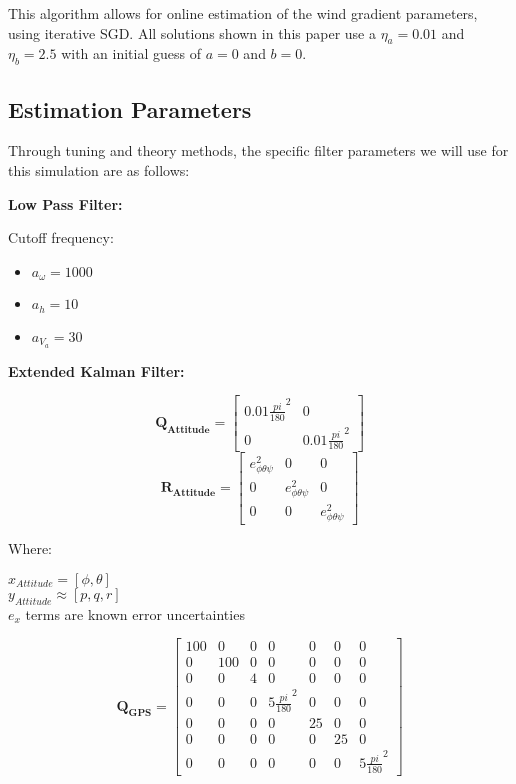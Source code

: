 This algorithm allows for online estimation of the wind gradient parameters, using iterative SGD.
All solutions shown in this paper use a $\eta_{a} = 0.01$ and $\eta_{b} = 2.5$ with an initial guess of $a = 0$ and $b = 0$.

\subsection{Estimation Parameters}

Through tuning and theory methods, the specific filter parameters we will use for this simulation are as follows:

\textbf{Low Pass Filter:}

Cutoff frequency:
\begin{itemize}
    \item $a_{\omega} = 1000$
    \item $a_{h} = 10$
    \item $a_{V_{a}} = 30$
\end{itemize}

\textbf{Extended Kalman Filter:}

\begin{equation}
    \mathbf{Q_{Attitude}} = \begin{bmatrix}
        0.01 \frac{pi}{180} ^ 2 & 0 \\
        0 & 0.01 \frac{pi}{180} ^ 2
    \end{bmatrix}
\end{equation}
\begin{equation}
    \mathbf{R_{Attitude}} = \begin{bmatrix}
        e_{\phi \theta \psi}^2 & 0 & 0 \\
        0 & e_{\phi \theta \psi}^2 & 0 \\
        0 & 0 & e_{\phi \theta \psi}^2
    \end{bmatrix}
\end{equation}

Where:
\begin{center}
$x_{Attitude} = [\phi, \theta]$ \\
$y_{Attitude} \approx [p, q, r]$ \\
$e_{x}$ terms are known error uncertainties
\end{center}


\begin{equation}
    \mathbf{Q_{GPS}} = \begin{bmatrix}
        100 & 0 & 0 & 0 & 0 & 0 & 0 \\
        0 & 100 & 0 & 0 & 0 & 0 & 0 \\
        0 & 0 & 4 & 0 & 0 & 0 & 0 \\
        0 & 0 & 0 & 5 \frac{pi}{180} ^ 2 & 0 & 0 & 0 \\
        0 & 0 & 0 & 0 & 25 & 0 & 0 \\
        0 & 0 & 0 & 0 & 0 & 25 & 0 \\
        0 & 0 & 0 & 0 & 0 & 0 & 5 \frac{pi}{180} ^ 2
    \end{bmatrix}
    \label{eq:ekf_q_gps}
\end{equation}


